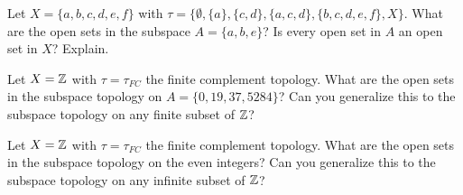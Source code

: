 \begin{pa}
	\item Let $X= \{a,b,c,d,e,f\}$ with $\tau = \{\emptyset,\{a\}, \{c,d\}, \{a,c,d\}, \{b,c,d,e,f\}, X\}$. What are the open sets in the subspace $A = \{a, b, e\}$? Is every open set in $A$ an open set in $X$? Explain.

	\item Let $X=\mathbb{Z}$ with $\tau = \tau_{FC}$ the finite complement topology. What are the open sets in the subspace topology on $A = \{0,19, 37, 5284\}$? Can you generalize this to the subspace topology on any finite subset of $\mathbb{Z}$? 

\item Let $X=\mathbb{Z}$ with $\tau = \tau_{FC}$ the finite complement topology. What are the open sets in the subspace topology on the even integers?  Can you generalize this to the subspace topology on any infinite subset of $\mathbb{Z}$? 

\ea

\ee

\end{pa}


